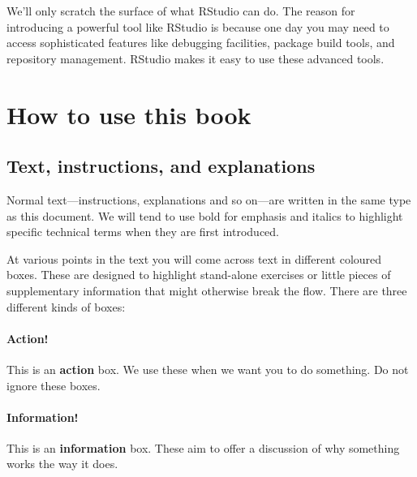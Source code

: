 \documentclass[
]{book}
\newenvironment{greybox}{
  \definecolor{shadecolor}{rgb}{0.95,0.95,0.95}  %
  \color{black}
  \begin{shaded}}
 {\end{shaded}}
\newenvironment{infobox}[1]
  {
  \begin{itemize}
  \renewcommand{\labelitemi}{
    \raisebox{-.7\height}[0pt][0pt]{
      {\setkeys{Gin}{width=3em,keepaspectratio}
        \texttt{[image: images/\#1]}}
    }
  }
  \setlength{\fboxsep}{1em}
  \begin{greybox}
  \item
  }
  {
  \end{greybox}
  \end{itemize}
  }
\begin{document}
We'll only scratch the surface of what RStudio can do. The reason for introducing a powerful tool like RStudio is because one day you may need to access sophisticated features like debugging facilities, package build tools, and repository management. RStudio makes it easy to use these advanced tools.

\hypertarget{how-to-use-this-book}{%
\chapter*{How to use this book}\label{how-to-use-this-book}}

\hypertarget{text-instructions-and-explanations}{%
\section*{Text, instructions, and explanations}\label{text-instructions-and-explanations}}

Normal text---instructions, explanations and so on---are written in the same type as this document. We will tend to use bold for emphasis and italics to highlight specific technical terms when they are first introduced.

At various points in the text you will come across text in different coloured boxes. These are designed to highlight stand-alone exercises or little pieces of supplementary information that might otherwise break the flow. There are three different kinds of boxes:

\begin{infobox}{action}

\hypertarget{action}{%
\subsubsection*{Action!}\label{action}}

This is an \textbf{action} box. We use these when we want you to do something. Do not ignore these boxes.

\end{infobox}

\begin{infobox}{information}

\hypertarget{information}{%
\subsubsection*{Information!}\label{information}}

This is an \textbf{information} box. These aim to offer a discussion of why something works the way it does.

\end{infobox}
\end{document}
